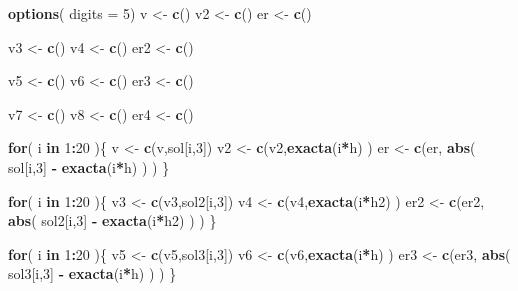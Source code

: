 \documentclass[]{article}
\newenvironment{Shaded}{\begin{snugshade}}{\end{snugshade}}
\newcommand{\KeywordTok}[1]{\textcolor[rgb]{0.13,0.29,0.53}{\textbf{#1}}}
\newcommand{\DataTypeTok}[1]{\textcolor[rgb]{0.13,0.29,0.53}{#1}}
\newcommand{\DecValTok}[1]{\textcolor[rgb]{0.00,0.00,0.81}{#1}}
\newcommand{\StringTok}[1]{\textcolor[rgb]{0.31,0.60,0.02}{#1}}
\newcommand{\ControlFlowTok}[1]{\textcolor[rgb]{0.13,0.29,0.53}{\textbf{#1}}}
\newcommand{\OperatorTok}[1]{\textcolor[rgb]{0.81,0.36,0.00}{\textbf{#1}}}
\newcommand{\NormalTok}[1]{#1}
\begin{document}
\begin{Shaded}
\begin{Highlighting}[]
\KeywordTok{options}\NormalTok{( }\DataTypeTok{digits =} \DecValTok{5}\NormalTok{)}
\NormalTok{v <-}\StringTok{ }\KeywordTok{c}\NormalTok{()}
\NormalTok{v2 <-}\StringTok{ }\KeywordTok{c}\NormalTok{()}
\NormalTok{er <-}\StringTok{ }\KeywordTok{c}\NormalTok{()}

\NormalTok{v3 <-}\StringTok{ }\KeywordTok{c}\NormalTok{()}
\NormalTok{v4 <-}\StringTok{ }\KeywordTok{c}\NormalTok{()}
\NormalTok{er2 <-}\StringTok{ }\KeywordTok{c}\NormalTok{()}

\NormalTok{v5 <-}\StringTok{ }\KeywordTok{c}\NormalTok{()}
\NormalTok{v6 <-}\StringTok{ }\KeywordTok{c}\NormalTok{()}
\NormalTok{er3 <-}\StringTok{ }\KeywordTok{c}\NormalTok{()}

\NormalTok{v7 <-}\StringTok{ }\KeywordTok{c}\NormalTok{()}
\NormalTok{v8 <-}\StringTok{ }\KeywordTok{c}\NormalTok{()}
\NormalTok{er4 <-}\StringTok{ }\KeywordTok{c}\NormalTok{()}

\ControlFlowTok{for}\NormalTok{( i }\ControlFlowTok{in} \DecValTok{1}\OperatorTok{:}\DecValTok{20}\NormalTok{ )\{}
\NormalTok{  v <-}\StringTok{ }\KeywordTok{c}\NormalTok{(v,sol[i,}\DecValTok{3}\NormalTok{])}
\NormalTok{  v2 <-}\StringTok{ }\KeywordTok{c}\NormalTok{(v2,}\KeywordTok{exacta}\NormalTok{(i}\OperatorTok{*}\NormalTok{h) )}
\NormalTok{  er <-}\StringTok{ }\KeywordTok{c}\NormalTok{(er, }\KeywordTok{abs}\NormalTok{( sol[i,}\DecValTok{3}\NormalTok{] }\OperatorTok{-}\StringTok{ }\KeywordTok{exacta}\NormalTok{(i}\OperatorTok{*}\NormalTok{h) ) )}
\NormalTok{\}}

\ControlFlowTok{for}\NormalTok{( i }\ControlFlowTok{in} \DecValTok{1}\OperatorTok{:}\DecValTok{20}\NormalTok{ )\{}
\NormalTok{  v3 <-}\StringTok{ }\KeywordTok{c}\NormalTok{(v3,sol2[i,}\DecValTok{3}\NormalTok{])}
\NormalTok{  v4 <-}\StringTok{ }\KeywordTok{c}\NormalTok{(v4,}\KeywordTok{exacta}\NormalTok{(i}\OperatorTok{*}\NormalTok{h2) )}
\NormalTok{  er2 <-}\StringTok{ }\KeywordTok{c}\NormalTok{(er2, }\KeywordTok{abs}\NormalTok{( sol2[i,}\DecValTok{3}\NormalTok{] }\OperatorTok{-}\StringTok{ }\KeywordTok{exacta}\NormalTok{(i}\OperatorTok{*}\NormalTok{h2) ) )}
\NormalTok{\}}

\ControlFlowTok{for}\NormalTok{( i }\ControlFlowTok{in} \DecValTok{1}\OperatorTok{:}\DecValTok{20}\NormalTok{ )\{}
\NormalTok{  v5 <-}\StringTok{ }\KeywordTok{c}\NormalTok{(v5,sol3[i,}\DecValTok{3}\NormalTok{])}
\NormalTok{  v6 <-}\StringTok{ }\KeywordTok{c}\NormalTok{(v6,}\KeywordTok{exacta}\NormalTok{(i}\OperatorTok{*}\NormalTok{h) )}
\NormalTok{  er3 <-}\StringTok{ }\KeywordTok{c}\NormalTok{(er3, }\KeywordTok{abs}\NormalTok{( sol3[i,}\DecValTok{3}\NormalTok{] }\OperatorTok{-}\StringTok{ }\KeywordTok{exacta}\NormalTok{(i}\OperatorTok{*}\NormalTok{h) ) )}
\NormalTok{\}}


\end{Highlighting}
\end{Shaded}
\end{document}
